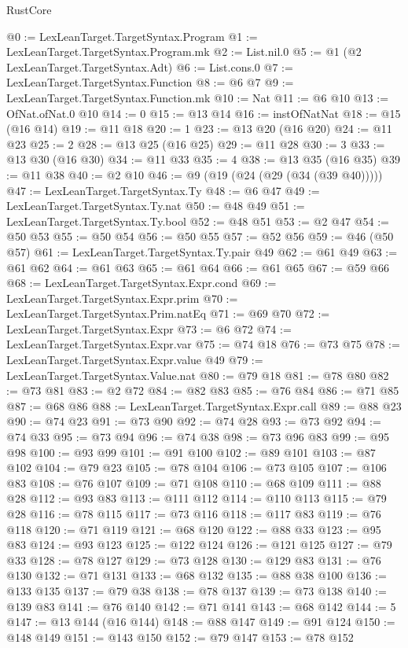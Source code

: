 \begin{lexlean}{RustCore}
\begin{coremodule}
@0 := LexLeanTarget.TargetSyntax.Program
@1 := LexLeanTarget.TargetSyntax.Program.mk
@2 := List.nil.{0}
@5 := @1 (@2 LexLeanTarget.TargetSyntax.Adt)
@6 := List.cons.{0}
@7 := LexLeanTarget.TargetSyntax.Function
@8 := @6 @7
@9 := LexLeanTarget.TargetSyntax.Function.mk
@10 := Nat
@11 := @6 @10
@13 := OfNat.ofNat.{0} @10
@14 := 0
@15 := @13 @14
@16 := instOfNatNat
@18 := @15 (@16 @14)
@19 := @11 @18
@20 := 1
@23 := @13 @20 (@16 @20)
@24 := @11 @23
@25 := 2
@28 := @13 @25 (@16 @25)
@29 := @11 @28
@30 := 3
@33 := @13 @30 (@16 @30)
@34 := @11 @33
@35 := 4
@38 := @13 @35 (@16 @35)
@39 := @11 @38
@40 := @2 @10
@46 := @9 (@19 (@24 (@29 (@34 (@39 @40)))))
@47 := LexLeanTarget.TargetSyntax.Ty
@48 := @6 @47
@49 := LexLeanTarget.TargetSyntax.Ty.nat
@50 := @48 @49
@51 := LexLeanTarget.TargetSyntax.Ty.bool
@52 := @48 @51
@53 := @2 @47
@54 := @50 @53
@55 := @50 @54
@56 := @50 @55
@57 := @52 @56
@59 := @46 (@50 @57)
@61 := LexLeanTarget.TargetSyntax.Ty.pair @49
@62 := @61 @49
@63 := @61 @62
@64 := @61 @63
@65 := @61 @64
@66 := @61 @65
@67 := @59 @66
@68 := LexLeanTarget.TargetSyntax.Expr.cond
@69 := LexLeanTarget.TargetSyntax.Expr.prim
@70 := LexLeanTarget.TargetSyntax.Prim.natEq
@71 := @69 @70
@72 := LexLeanTarget.TargetSyntax.Expr
@73 := @6 @72
@74 := LexLeanTarget.TargetSyntax.Expr.var
@75 := @74 @18
@76 := @73 @75
@78 := LexLeanTarget.TargetSyntax.Expr.value @49
@79 := LexLeanTarget.TargetSyntax.Value.nat
@80 := @79 @18
@81 := @78 @80
@82 := @73 @81
@83 := @2 @72
@84 := @82 @83
@85 := @76 @84
@86 := @71 @85
@87 := @68 @86
@88 := LexLeanTarget.TargetSyntax.Expr.call
@89 := @88 @23
@90 := @74 @23
@91 := @73 @90
@92 := @74 @28
@93 := @73 @92
@94 := @74 @33
@95 := @73 @94
@96 := @74 @38
@98 := @73 @96 @83
@99 := @95 @98
@100 := @93 @99
@101 := @91 @100
@102 := @89 @101
@103 := @87 @102
@104 := @79 @23
@105 := @78 @104
@106 := @73 @105
@107 := @106 @83
@108 := @76 @107
@109 := @71 @108
@110 := @68 @109
@111 := @88 @28
@112 := @93 @83
@113 := @111 @112
@114 := @110 @113
@115 := @79 @28
@116 := @78 @115
@117 := @73 @116
@118 := @117 @83
@119 := @76 @118
@120 := @71 @119
@121 := @68 @120
@122 := @88 @33
@123 := @95 @83
@124 := @93 @123
@125 := @122 @124
@126 := @121 @125
@127 := @79 @33
@128 := @78 @127
@129 := @73 @128
@130 := @129 @83
@131 := @76 @130
@132 := @71 @131
@133 := @68 @132
@135 := @88 @38 @100
@136 := @133 @135
@137 := @79 @38
@138 := @78 @137
@139 := @73 @138
@140 := @139 @83
@141 := @76 @140
@142 := @71 @141
@143 := @68 @142
@144 := 5
@147 := @13 @144 (@16 @144)
@148 := @88 @147
@149 := @91 @124
@150 := @148 @149
@151 := @143 @150
@152 := @79 @147
@153 := @78 @152

\end{coremodule}
\end{lexlean}

